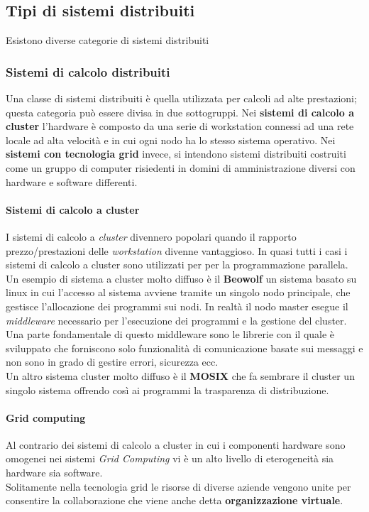 \subsection{Tipi di sistemi distribuiti}
Esistono diverse categorie di sistemi distribuiti 
\subsubsection{Sistemi di calcolo distribuiti}
Una classe di sistemi distribuiti è quella utilizzata per calcoli ad alte prestazioni; questa categoria può essere divisa in due sottogruppi. Nei \textbf{sistemi di calcolo a cluster} l'hardware è composto da una serie di workstation connessi ad una rete locale ad alta velocità e in cui ogni nodo ha lo stesso sistema operativo. Nei \textbf{sistemi con tecnologia grid} invece, si intendono sistemi distribuiti costruiti come un gruppo di computer risiedenti in domini di amministrazione diversi con hardware e software differenti.
\paragraph{Sistemi di calcolo a cluster} I sistemi di calcolo a \emph{cluster} divennero popolari quando il rapporto prezzo/prestazioni delle \emph{workstation} divenne vantaggioso. In quasi tutti i casi i sistemi di calcolo a cluster sono utilizzati per per la programmazione parallela.\\
Un esempio di sistema a cluster molto diffuso è il \textbf{Beowolf} un sistema basato su linux in cui l'accesso al sistema avviene tramite un singolo nodo principale, che gestisce l'allocazione dei programmi sui nodi. In realtà il nodo master esegue il \emph{middleware} necessario per l'esecuzione dei programmi e la gestione del cluster. Una parte fondamentale di questo middleware sono le librerie con il quale è sviluppato che forniscono solo funzionalità di comunicazione basate sui messaggi e non sono in grado di gestire errori, sicurezza ecc.\\
Un altro sistema cluster molto diffuso è il \textbf{MOSIX} che fa sembrare il cluster un singolo sistema offrendo così ai programmi la trasparenza di distribuzione.
\paragraph{Grid computing} Al contrario dei sistemi di calcolo a cluster in cui  i componenti hardware sono omogenei nei sistemi \emph{Grid Computing} vi è un alto livello di eterogeneità sia hardware sia software.\\
Solitamente nella tecnologia grid le risorse di diverse aziende vengono unite per consentire la collaborazione che viene anche detta \textbf{organizzazione virtuale}.
